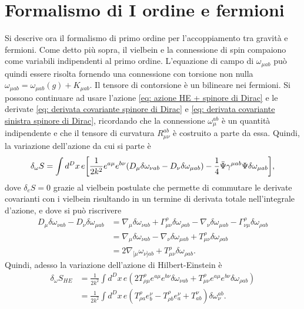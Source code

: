 \section{Formalismo di I ordine e fermioni}
Si descrive ora il formalismo di primo ordine per l'accoppiamento tra gravità e fermioni. Come detto più sopra, il vielbein e la connessione di spin compaiono come variabili indipendenti al primo ordine. L'equazione di campo di $\omega_{\mu ab}$ può quindi essere risolta fornendo una connessione con torsione non nulla $\omega_{\mu ab} = \omega_{\mu ab}(g) + K_{\mu ab}$. Il tensore di contorsione è un bilineare nei fermioni. Si possono continuare ad usare l'azione \eqref{eq: azione HE + spinore di Dirac} e le derivate \eqref{eq: derivata covariante spinore di Dirac} e \eqref{eq: derivata covariante sinistra spinore di Dirac}, ricordando che la connessione $\omega_\mu^{ab}$ è un quantità indipendente e che il tensore di curvatura $R_{\mu\nu}^{ab}$ è costruito a parte da essa. Quindi, la variazione dell'azione da cui si parte è 
\begin{equation}
    \delta_\omega S = \int d^Dx\,e\bigg[\frac{1}{2k^2}e^{a\mu}e^{b\nu}(D_\mu\delta\omega_{\nu ab} - D_\nu\delta\omega_{\mu ab}) - \frac{1}{4}\bar{\Psi}\gamma^{\mu ab}\Psi\delta\omega_{\mu ab}\bigg],
\end{equation}
dove $\delta_e S = 0$ grazie al vielbein postulate che permette di commutare le derivate covarianti con i vielbein risultando in un termine di derivata totale nell'integrale d'azione, e dove si può riscrivere
\begin{equation}
    \begin{split}
        D_\mu\delta\omega_{\nu ab} - D_\nu\delta\omega_{\mu ab} &= \nabla_\mu\delta\omega_{\nu ab} + \Gamma^\rho_{\mu\nu}\delta\omega_{\rho ab} - \nabla_\nu\delta\omega_{\mu ab} - \Gamma^\rho_{\nu\mu}\delta\omega_{\rho ab} \\
        &= \nabla_\mu\delta\omega_{\nu ab} - \nabla_\nu\delta\omega_{\mu ab} + T^\rho_{\mu\nu}\delta\omega_{\rho ab} \\
        &= 2\nabla_{[\mu}\omega_{\nu]ab} + T^\rho_{\mu\nu}\delta\omega_{\rho ab}.
    \end{split}
\end{equation}
Quindi, adesso la variazione dell'azione di Hilbert-Einstein è 
\begin{equation}
\label{eq: variazione azione HE (I ordine)}
    \begin{split}
        \delta_\omega S_{HE} &= \frac{1}{2k^2}\int d^Dx\,e(2T^\rho_{\rho\mu}e^{a\mu}e^{b\nu}\delta\omega_{\nu ab} + T^\rho_{\mu\nu}e^{a\mu}e^{b\nu}\delta\omega_{\rho ab}) \\
        &= \frac{1}{2k^2}\int d^Dx\,e(T^\rho_{\rho a}e^\nu_b - T^\rho_{\rho b}e^\nu_a + T^\nu_{ab})\delta\omega^{ab}_\nu.
    \end{split}
\end{equation}

